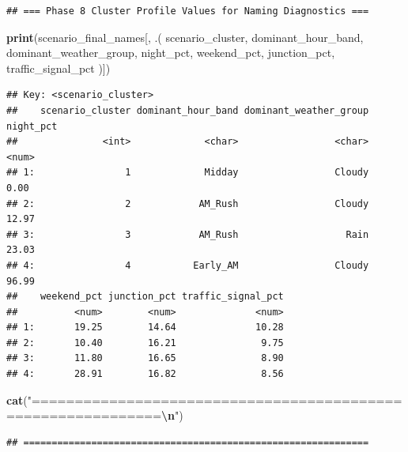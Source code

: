 \documentclass[
]{article}
\newenvironment{Shaded}{\begin{snugshade}}{\end{snugshade}}
\newcommand{\FunctionTok}[1]{\textcolor[rgb]{0.13,0.29,0.53}{\textbf{#1}}}
\newcommand{\NormalTok}[1]{#1}
\newcommand{\SpecialCharTok}[1]{\textcolor[rgb]{0.81,0.36,0.00}{\textbf{#1}}}
\newcommand{\StringTok}[1]{\textcolor[rgb]{0.31,0.60,0.02}{#1}}
\begin{document}
\begin{verbatim}
## === Phase 8 Cluster Profile Values for Naming Diagnostics ===
\end{verbatim}

\begin{Shaded}
\begin{Highlighting}[]
\FunctionTok{print}\NormalTok{(scenario\_final\_names[, .(}
\NormalTok{  scenario\_cluster, dominant\_hour\_band, dominant\_weather\_group,}
\NormalTok{  night\_pct, weekend\_pct, junction\_pct, traffic\_signal\_pct}
\NormalTok{)])}
\end{Highlighting}
\end{Shaded}

\begin{verbatim}
## Key: <scenario_cluster>
##    scenario_cluster dominant_hour_band dominant_weather_group night_pct
##               <int>             <char>                 <char>     <num>
## 1:                1             Midday                 Cloudy      0.00
## 2:                2            AM_Rush                 Cloudy     12.97
## 3:                3            AM_Rush                   Rain     23.03
## 4:                4           Early_AM                 Cloudy     96.99
##    weekend_pct junction_pct traffic_signal_pct
##          <num>        <num>              <num>
## 1:       19.25        14.64              10.28
## 2:       10.40        16.21               9.75
## 3:       11.80        16.65               8.90
## 4:       28.91        16.82               8.56
\end{verbatim}

\begin{Shaded}
\begin{Highlighting}[]
\FunctionTok{cat}\NormalTok{(}\StringTok{"=============================================================}\SpecialCharTok{\textbackslash{}n}\StringTok{"}\NormalTok{)}
\end{Highlighting}
\end{Shaded}

\begin{verbatim}
## =============================================================
\end{verbatim}
\end{document}
